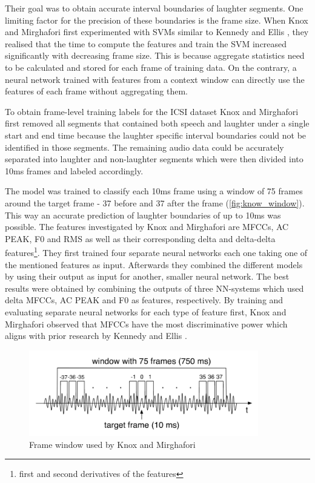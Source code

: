\documentclass[bsc,frontabs,parskip,deptreport]{infthesis}
\begin{document}
Their goal was to obtain accurate interval boundaries of laughter segments.
One limiting factor for the precision of these boundaries is the frame size. 
When Knox and Mirghafori first experimented with SVMs similar to Kennedy and Ellis \citep{kennedy2004laughter}, they realised that the time to compute the features and train the SVM increased significantly with decreasing frame size. 
This is because aggregate statistics need to be calculated and stored for each frame of training data.  
On the contrary, a neural network trained with features from a context window can directly use the features of each frame without aggregating them.  

To obtain frame-level training labels for the ICSI dataset Knox and Mirghafori first removed all segments that contained both speech and laughter under a single start and end time because the laughter specific interval boundaries could not be identified in those segments. 
The remaining audio data could be accurately separated into laughter and non-laughter segments which were then divided into 10ms frames and labeled accordingly.

The model was trained to classify each 10ms frame using a window of 75 frames around the target frame - 37 before and 37 after the frame (\autoref{fig:know_window}).
This way an accurate prediction of laughter boundaries of up to 10ms was possible. 
The features investigated by Knox and Mirghafori are MFCCs, AC PEAK, F0 and RMS as well as their corresponding delta and delta-delta features\footnote{first and second derivatives of the features}.
They first trained four separate neural networks each one taking one of the mentioned features as input.
Afterwards they combined the different models by using their output as input for another, smaller neural network.
The best results were obtained by combining the outputs of three NN-systems which used delta MFCCs, AC PEAK and F0 as features, respectively.
By training and evaluating separate neural networks for each type of feature first, Knox and Mirghafori observed that MFCCs have the most discriminative power which aligns with prior research by Kennedy and Ellis \citep{kennedy2004laughter}.

\begin{figure}[htp]
    \centering
    \includegraphics[width=10cm]{imgs/Knox_window.png}
    \caption{Frame window used by Knox and Mirghafori}
    \label{fig:know_window}
\end{figure}
\end{document}
